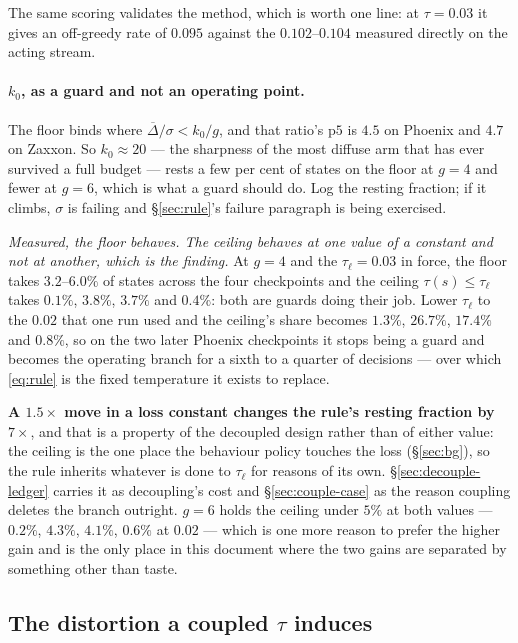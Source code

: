 \documentclass{article}
\newcommand{\gapbar}{\overline{\Delta}}
\newcommand{\srank}{\sigma}
\begin{document}
The same scoring validates the method, which is worth one line: at $\tau = 0.03$ it gives an
off-greedy rate of $0.095$ against the $0.102$--$0.104$ measured directly on the acting stream.

\paragraph{$k_0$, as a guard and not an operating point.} The floor binds where
$\gapbar/\srank < k_0/g$, and that ratio's $\text{p}5$ is $4.5$ on Phoenix and $4.7$ on Zaxxon.
So $k_0 \approx 20$ --- the sharpness of the most diffuse arm that has ever survived a full
budget --- rests a few per cent of states on the floor at $g = 4$ and fewer at $g = 6$, which is
what a guard should do. Log the resting fraction; if it climbs, $\srank$ is failing and
\S\ref{sec:rule}'s failure paragraph is being exercised.

\emph{Measured, the floor behaves. The ceiling behaves at one value of a constant and not at
another, which is the finding.} At $g = 4$ and the $\tau_\ell = 0.03$ in force, the floor takes
$3.2$--$6.0\%$ of states across the four checkpoints and the ceiling $\tau(s) \le \tau_\ell$ takes
$0.1\%$, $3.8\%$, $3.7\%$ and $0.4\%$: both are guards doing their job. Lower $\tau_\ell$ to the
$0.02$ that one run used and the ceiling's share becomes $1.3\%$, $26.7\%$, $17.4\%$ and $0.8\%$,
so on the two later Phoenix checkpoints it stops being a guard and becomes the operating branch
for a sixth to a quarter of decisions --- over which \eqref{eq:rule} is the fixed temperature it
exists to replace.

\textbf{A $1.5\times$ move in a loss constant changes the rule's resting fraction by $7\times$},
and that is a property of the decoupled design rather than of either value: the ceiling is the one
place the behaviour policy touches the loss (\S\ref{sec:bg}), so the rule inherits whatever is
done to $\tau_\ell$ for reasons of its own. \S\ref{sec:decouple-ledger} carries it as decoupling's
cost and \S\ref{sec:couple-case} as the reason coupling deletes the branch outright. $g = 6$
holds the ceiling under $5\%$ at both values --- $0.2\%$, $4.3\%$, $4.1\%$, $0.6\%$ at $0.02$ ---
which is one more reason to prefer the higher gain and is the only place in this document where
the two gains are separated by something other than taste.

\subsection{The distortion a coupled $\tau$ induces}
\label{sec:meas-couple}
\end{document}
